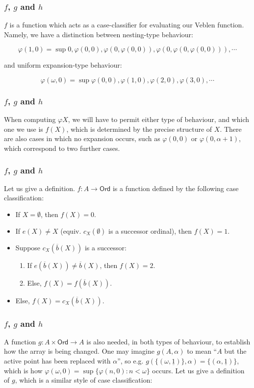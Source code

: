 \documentclass{beamer}
\begin{document}
\begin{frame}
\frametitle{$f$, $g$ and $h$}
$f$ is a function which acts as a case-classifier for evaluating our Veblen function. Namely, we have a distinction between \alert{nesting}-type behaviour:

\begin{equation}
\varphi(1,0) = \sup 0, \varphi(0,0), \varphi(0,\varphi(0,0)), \varphi(0,\varphi(0,\varphi(0,0))), \cdots
\end{equation}

and \alert{uniform expansion}-type behaviour:

\begin{equation}
\varphi(\omega,0) = \sup \varphi(0,0), \varphi(1,0), \varphi(2,0), \varphi(3,0), \cdots
\end{equation}
\end{frame}

\begin{frame}
\frametitle{$f$, $g$ and $h$}
When computing $\varphi X$, we will have to permit either type of behaviour, and which one we use is $f(X)$, which is determined by the precise structure of $X$. There are also cases in which no expansion occurs, such as $\varphi(0,0)$ or $\varphi(0,\alpha+1)$, which correspond to two further cases.
\end{frame}

\begin{frame}
\frametitle{$f$, $g$ and $h$}
Let us give a definition. $f: A \to \mathsf{Ord}$ is a function defined by the following case classification:

\begin{itemize}
    \item If $X = \emptyset$, then $f(X) = 0$.
    \item If $e(X) \neq X$ (equiv. $c_X(\emptyset)$ is a successor ordinal), then $f(X) = 1$.
    \item Suppose $c_X(\overline{b}(X))$ is a successor:
    \begin{enumerate}
        \item If $e(\overline{b}(X)) \neq \overline{b}(X)$, then $f(X) = 2$.
        \item Else, $f(X) = f(\overline{b}(X))$.
    \end{enumerate}
    \item Else, $f(X) = c_X(\overline{b}(X))$.
\end{itemize}
\end{frame}

\begin{frame}
\frametitle{$f$, $g$ and $h$}
A function $g: A \times \mathsf{Ord} \to A$ is also needed, in both types of behaviour, to establish how the array is being changed. One may imagine $g(A, \alpha)$ to mean ``$A$ but the active point has been replaced with $\alpha$'', so e.g. $g(\{(\omega, \underline{1})\}, \alpha) = \{(\alpha, \underline{1})\}$, which is how $\varphi(\omega, 0) = \sup\{\varphi(n, 0): n < \omega\}$ occurs. Let us give a definition of $g$, which is a similar style of case classification:
\end{frame}
\end{document}
